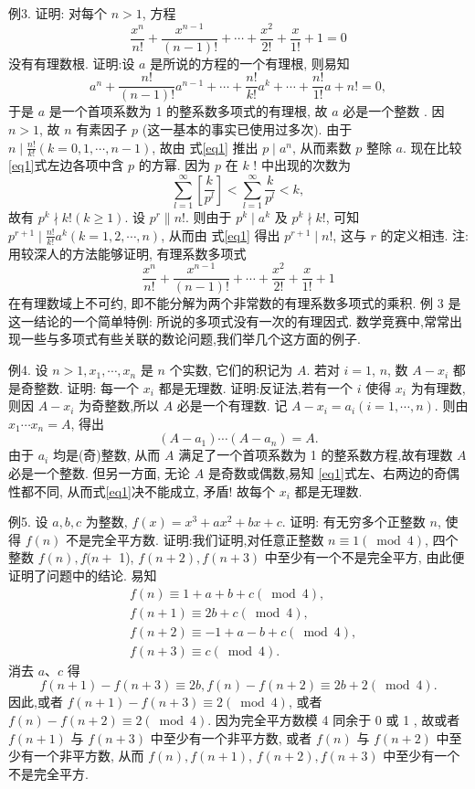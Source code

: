 例3. 证明: 对每个 $n>1$, 方程
$$
\frac{x^n}{n !}+\frac{x^{n-1}}{(n-1) !}+\cdots+\frac{x^2}{2 !}+\frac{x}{1 !}+1=0
$$
没有有理数根.
证明:设 $a$ 是所说的方程的一个有理根, 则易知
$$
a^n+\frac{n !}{(n-1) !} a^{n-1}+\cdots+\frac{n !}{k !} a^k+\cdots+\frac{n !}{1 !} a+n !=0, \label{eq1}
$$
于是 $a$ 是一个首项系数为 1 的整系数多项式的有理根, 故 $a$ 必是一个整数 .
因 $n>1$, 故 $n$ 有素因子 $p$ (这一基本的事实已使用过多次). 由于 $n \mid \frac{n !}{k !}(k= 0,1, \cdots, n-1)$, 故由 式\ref{eq1} 推出 $p \mid a^n$, 从而素数 $p$ 整除 $a$. 现在比较\ref{eq1}式左边各项中含 $p$ 的方幂.
因为 $p$ 在 $k$ ! 中出现的次数为
$$
\sum_{l=1}^{\infty}\left[\frac{k}{p^l}\right]<\sum_{l=1}^{\infty} \frac{k}{p^l}<k,
$$
故有 $p^k \nmid k !(k \geqslant 1)$. 设 $p^r \| n !$. 则由于 $p^k \mid a^k$ 及 $p^k \nmid k !$, 可知 $p^{r+1} \mid \frac{n !}{k !} a^k(k= 1,2, \cdots, n)$, 从而由 式\ref{eq1} 得出 $p^{r+1} \mid n !$, 这与 $r$ 的定义相违.
注:用较深人的方法能够证明, 有理系数多项式
$$
\frac{x^n}{n !}+\frac{x^{n-1}}{(n-1) !}+\cdots+\frac{x^2}{2 !}+\frac{x}{1 !}+1
$$
在有理数域上不可约, 即不能分解为两个非常数的有理系数多项式的乘积.
例 3 是这一结论的一个简单特例: 所说的多项式没有一次的有理因式.
数学竞赛中,常常出现一些与多项式有些关联的数论问题,我们举几个这方面的例子.



例4. 设 $n>1, x_1, \cdots, x_n$ 是 $n$ 个实数, 它们的积记为 $A$. 若对 $i=1$, $n$, 数 $A-x_i$ 都是奇整数.
证明: 每一个 $x_i$ 都是无理数.
证明:反证法,若有一个 $i$ 使得 $x_i$ 为有理数,则因 $A-x_i$ 为奇整数,所以 $A$ 必是一个有理数.
记 $A-x_i=a_i(i=1, \cdots, n)$. 则由 $x_1 \cdots x_n=A$, 得出
$$
\left(A-a_1\right) \cdots\left(A-a_n\right)=A . \label{eq1}
$$
由于 $a_i$ 均是(奇)整数, 从而 $A$ 满足了一个首项系数为 1 的整系数方程,故有理数 $A$ 必是一个整数.
但另一方面, 无论 $A$ 是奇数或偶数,易知 \ref{eq1}式左、右两边的奇偶性都不同, 从而式\ref{eq1}决不能成立, 矛盾! 故每个 $x_i$ 都是无理数.



例5. 设 $a, b, c$ 为整数, $f(x)=x^3+a x^2+b x+c$. 证明: 有无穷多个正整数 $n$, 使得 $f(n)$ 不是完全平方数.
证明:我们证明,对任意正整数 $n \equiv 1(\bmod 4)$, 四个整数 $f(n), f(n+$ 1), $f(n+2), f(n+3)$ 中至少有一个不是完全平方, 由此便证明了问题中的结论.
易知
$$
\begin{aligned}
& f(n) \equiv 1+a+b+c(\bmod 4), \\
& f(n+1) \equiv 2 b+c(\bmod 4), \\
& f(n+2) \equiv-1+a-b+c(\bmod 4), \\
& f(n+3) \equiv c(\bmod 4) .
\end{aligned}
$$
消去 $a 、 c$ 得
$$
f(n+1)-f(n+3) \equiv 2 b, f(n)-f(n+2) \equiv 2 b+2(\bmod 4) .
$$
因此,或者 $f(n+1)-f(n+3) \equiv 2(\bmod 4)$, 或者 $f(n)-f(n+2) \equiv 2(\bmod 4)$. 因为完全平方数模 4 同余于 0 或 1 , 故或者 $f(n+1)$ 与 $f(n+3)$ 中至少有一个非平方数, 或者 $f(n)$ 与 $f(n+2)$ 中至少有一个非平方数, 从而 $f(n), f(n+1)$, $f(n+2), f(n+3)$ 中至少有一个不是完全平方.




